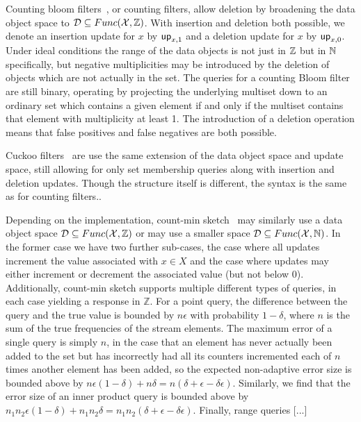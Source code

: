 Counting bloom filters~\cite{xxx}, or counting filters, allow deletion by broadening the data object space to $\mathcal{D} \subseteq Func(\mathcal{X},\mathbb{Z})$. With insertion and deletion both possible, we denote an insertion update for $x$ by $\mathsf{up}_{x,1}$ and a deletion update for $x$ by $\mathsf{up}_{x,0}$. Under ideal conditions the range of the data objects is not just in $\mathbb{Z}$ but in $\mathbb{N}$ specifically, but negative multiplicities may be introduced by the deletion of objects which are not actually in the set. The queries for a counting Bloom filter are still binary, operating by projecting the underlying multiset down to an ordinary set which contains a given element if and only if the multiset contains that element with multiplicity at least 1. The introduction of a deletion operation means that false positives and false negatives are both possible.%

Cuckoo filters~\cite{xxx} are use the same extension of the data object space and update space, still allowing for only set membership queries along with insertion and deletion updates. Though the structure itself is different, the syntax is the same as for counting filters..

Depending on the implementation, count-min sketch~\cite{xxx} may similarly use a data object space $\mathcal{D} \subseteq Func(\mathcal{X},\mathbb{Z})$ or may use a smaller space $\mathcal{D} \subseteq Func(\mathcal{X},\mathbb{N})$. In the former case we have two further sub-cases, the case where all updates increment the value associated with $x \in X$ and the case where updates may either increment or decrement the associated value (but not below 0). Additionally, count-min sketch supports multiple different types of queries, in each case yielding a response in $\mathbb{Z}$. For a point query, the difference between the query and the true value is bounded by $n\epsilon$ with probability $1-\delta$, where $n$ is the sum of the true frequencies of the stream elements. The maximum error of a single query is simply $n$, in the case that an element has never actually been added to the set but has incorrectly had all its counters incremented each of $n$ times another element has been added, so the expected non-adaptive error size is bounded above by $n\epsilon(1-\delta)+n\delta = n(\delta+\epsilon-\delta\epsilon)$.  Similarly, we find that the error size of an inner product query is bounded above by $n_1n_2\epsilon(1-\delta)+n_1n_2\delta = n_1n_2(\delta+\epsilon-\delta\epsilon)$. Finally, range queries [...]

